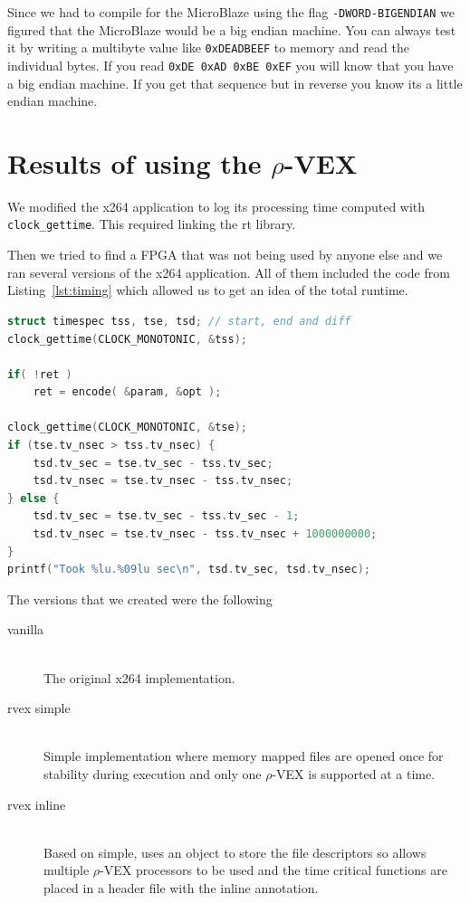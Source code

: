\documentclass{article}
\newcommand{\rvex}{\ensuremath{\rho}-VEX}
\begin{document}
Since we had to compile for the MicroBlaze using the flag
\texttt{-DWORD-BIGENDIAN} we figured that the MicroBlaze would be a big endian
machine.  You can always test it by writing a multibyte value like
\texttt{0xDEADBEEF} to memory and read the individual bytes. If you read
\texttt{0xDE 0xAD 0xBE 0xEF} you will know that you have a big endian machine.
If you get that sequence but in reverse you know its a little endian machine.

\section{Results of using the \rvex{}}

We modified the x264 application to log its processing time computed with
\texttt{clock\_gettime}. This required linking the rt library.

Then we tried to find a FPGA that was not being used by anyone else and we ran
several versions of the x264 application.  All of them included the code from
Listing~\ref{lst:timing} which allowed us to get an idea of the total runtime.

\begin{lstlisting}[language=C,style=C,caption=Capturing runtime with the monotonic clock,label=lst:timing]
struct timespec tss, tse, tsd; // start, end and diff
clock_gettime(CLOCK_MONOTONIC, &tss);

if( !ret )
    ret = encode( &param, &opt );

clock_gettime(CLOCK_MONOTONIC, &tse);
if (tse.tv_nsec > tss.tv_nsec) {
    tsd.tv_sec = tse.tv_sec - tss.tv_sec;
    tsd.tv_nsec = tse.tv_nsec - tss.tv_nsec;
} else {
    tsd.tv_sec = tse.tv_sec - tss.tv_sec - 1;
    tsd.tv_nsec = tse.tv_nsec - tss.tv_nsec + 1000000000;
}
printf("Took %lu.%09lu sec\n", tsd.tv_sec, tsd.tv_nsec);
\end{lstlisting}

The versions that we created were the following

\begin{description}
    \item[vanilla] \hfill \\
        The original x264 implementation.
    \item[rvex simple] \hfill \\
        Simple implementation where memory mapped files are opened once for stability during execution and only one \rvex{} is supported at a time.
    \item[rvex inline] \hfill \\
        Based on simple, uses an object to store the file descriptors so allows multiple \rvex{} processors to be used and the time critical functions are placed in a header file with the inline annotation.
\end{description}
\end{document}
